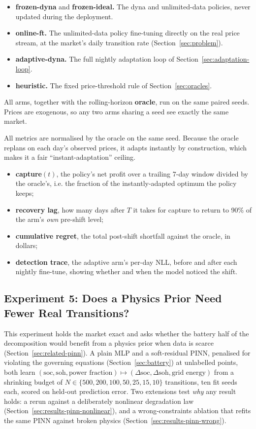 \documentclass[conference]{IEEEtran}
\begin{document}
\begin{itemize}
\item \textbf{frozen-dyna} and \textbf{frozen-ideal.} The dyna and unlimited-data policies, never updated during the deployment.
\item \textbf{online-ft.} The unlimited-data policy fine-tuning directly on the real price stream, at the market's daily transition rate (Section~\ref{sec:problem}).
\item \textbf{adaptive-dyna.} The full nightly adaptation loop of Section~\ref{sec:adaptation-loop}.
\item \textbf{heuristic.} The fixed price-threshold rule of Section~\ref{sec:oracles}.
\end{itemize}

All arms, together with the rolling-horizon \textbf{oracle}, run on the same paired seeds. Prices are exogenous, so any two arms sharing a seed see exactly the same market.

All metrics are normalised by the oracle on the same seed. Because the oracle replans on each day's observed prices, it adapts instantly by construction, which makes it a fair ``instant-adaptation'' ceiling.
\begin{itemize}
\item \textbf{capture}$(t)$, the policy's net profit over a trailing 7-day window divided by the oracle's, i.e. the fraction of the instantly-adapted optimum the policy keeps;
\item \textbf{recovery lag}, how many days after $T$ it takes for capture to return to 90\% of the arm's \emph{own} pre-shift level;
\item \textbf{cumulative regret}, the total post-shift shortfall against the oracle, in dollars;
\item \textbf{detection trace}, the adaptive arm's per-day NLL, before and after each nightly fine-tune, showing whether and when the model noticed the shift.
\end{itemize}

\subsection{Experiment 5: Does a Physics Prior Need Fewer Real Transitions?}
\label{sec:setup-pinn}

This experiment holds the market exact and asks whether the battery half of the decomposition would benefit from a physics prior when data is scarce (Section~\ref{sec:related-pinn}). A plain MLP and a soft-residual PINN, penalised for violating the governing equations (Section~\ref{sec:battery}) at unlabelled points, both learn $(\mathrm{soc}, \mathrm{soh}, \text{power fraction}) \mapsto (\Delta\mathrm{soc}, \Delta\mathrm{soh}, \text{grid energy})$ from a shrinking budget of $N \in \{500, 200, 100, 50, 25, 15, 10\}$ transitions, ten fit seeds each, scored on held-out prediction error. Two extensions test \emph{why} any result holds: a rerun against a deliberately nonlinear degradation law (Section~\ref{sec:results-pinn-nonlinear}), and a wrong-constraints ablation that refits the same PINN against broken physics (Section~\ref{sec:results-pinn-wrong}).
\end{document}

